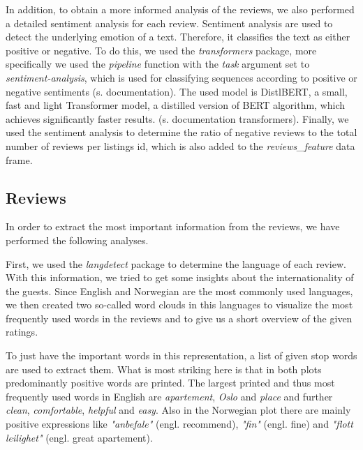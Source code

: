 \documentclass[12pt, letterpaper]{article}
\begin{document}
In addition, to obtain a more informed analysis of the reviews, we also performed a detailed sentiment analysis for each review. Sentiment analysis are used to detect the underlying emotion of a text. Therefore, it classifies the text as either positive or negative. 
To do this, we used the \textit{transformers} package, more specifically we used the \textit{pipeline} function 
with the \textit{task} argument set to \textit{sentiment-analysis}, which is used for classifying sequences
according to positive or negative sentiments (s. documentation). The used model is DistlBERT, 
a small, fast and light Transformer model, a distilled version of BERT algorithm, which achieves significantly faster results. (s. documentation transformers).
Finally, we used the sentiment analysis to determine the ratio of negative reviews to the total number of reviews per listings id, which is also added to the \textit{reviews\_feature} data frame. 




\subsection{Reviews}


In order to extract the most important information from the reviews, we have performed the following analyses.

First, we used the \textit{langdetect} package to determine the language of each review.
With this information, we tried to get some insights about the internationality of the guests.
Since English and Norwegian are the most commonly used languages, we then created two so-called word clouds in this languages to visualize the most frequently used words in the reviews and to give us a short overview of the given ratings.

To just have the important words in this representation, a list of given stop words are used to extract them.
What is most striking here is that in both plots predominantly positive words are printed.
The largest printed and thus most frequently used words in English are \textit{apartement}, \textit{Oslo} and \textit{place} and further \textit{clean}, \textit{comfortable}, \textit{helpful} and \textit{easy}.
Also in the Norwegian plot there are mainly positive expressions like \textit{"anbefale"} (engl. recommend), \textit{"fin"} (engl. fine) and \textit{"flott leilighet"} (engl. great apartement).
\end{document}

